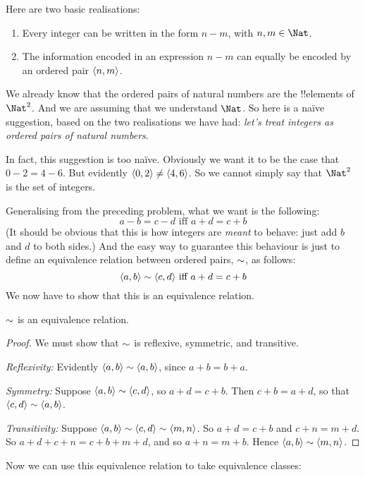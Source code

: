 \documentclass[../../../include/open-logic-section]{subfiles}
\begin{document}

Here are two basic realisations:
	\begin{enumerate}
		\item Every integer can be written in the form $n - m$, with $n, m \in\Nat$.
		\item The information encoded in an expression $n - m$ can equally be encoded by an ordered pair $\langle n, m \rangle$.
	\end{enumerate}
We already know that the ordered pairs of natural numbers are the !!{element}s of $\Nat^2$. And we are assuming that we understand $\Nat$. So here is a na\"{i}ve suggestion, based on the two realisations we have had: \emph{let's treat integers as ordered pairs of natural numbers}.

In fact, this suggestion is too na\"{i}ve. Obviously we want it to be the case that $0- 2 = 4 - 6$. But evidently $\langle 0, 2  \rangle\neq \langle 4, 6 \rangle$. So we cannot simply say that $\Nat^2$ is the set of integers. 

Generalising from the preceding problem, what we want is the following:
	$$a - b = c - d \text{ iff }a + d = c + b$$
(It should be obvious that this is how integers are \emph{meant} to behave: just add $b$ and $d$ to both sides.) And the easy way to guarantee this behaviour is just to define an equivalence relation between ordered pairs, $\sim$, as follows:
$$\langle  a, b  \rangle \sim \langle c, d \rangle\text{ iff }a + d = c + b$$  
We now have to show that this is an equivalence relation.
\begin{prop} $\sim$ is an equivalence relation.
\end{prop}
	\begin{proof}
	We must show that $\sim$ is reflexive, symmetric, and transitive. 
	
	\emph{Reflexivity:} Evidently $\langle a, b \rangle \sim \langle a, b \rangle$, since $a + b = b + a$.
	
	\emph{Symmetry:} Suppose $\langle a, b \rangle \sim \langle c, d \rangle$, so $a + d = c + b$. Then $c + b = a + d$, so that $\langle c, d \rangle \sim \langle a, b \rangle$.
	
	\emph{Transitivity:} Suppose $\langle a, b \rangle \sim \langle c, d \rangle\sim \langle m, n \rangle$. So $a + d = c + b$ and $c + n = m + d$. So $a + d + c + n = c + b + m + d$, and so $a + n = m + b$. Hence $\langle a, b  \rangle \sim \langle m, n \rangle$.		
\end{proof}

Now we can use this equivalence relation to take equivalence classes:
\end{document}

